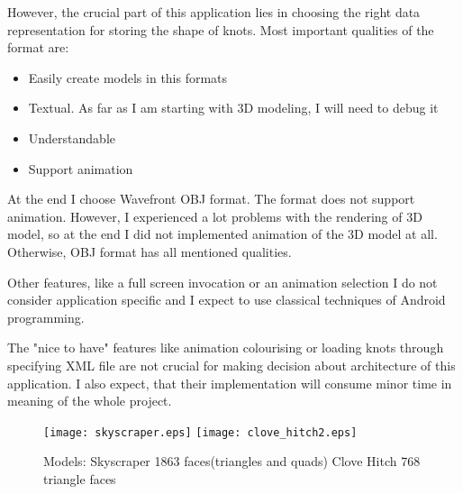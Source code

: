 However, the crucial part of this application lies 
in choosing the right data representation for storing the shape of knots.
Most important qualities of the format are:
\begin{itemize}
    \item Easily create models in this formats
    \item Textual. As far as I am starting with 3D modeling, 
    I will need to debug it
    \item Understandable
    \item Support animation
\end{itemize}

At the end I choose Wavefront OBJ format. The format does not support animation.
However, I experienced a lot problems with the rendering of 3D model,
so at the end I did not implemented animation of the 3D model at all. Otherwise, OBJ format has all mentioned qualities.

Other features, like a full screen invocation or an animation selection
I do not consider application specific and I expect
to use classical techniques of Android programming.

The "nice to have" features like animation colourising 
or loading knots through specifying XML file are not crucial 
for making decision about architecture of this application. 
I also expect, that their implementation will consume minor time
in meaning of the whole project.

\begin{figure}
\texttt{[image: skyscraper.eps]}
\texttt{[image: clove\_hitch2.eps]}
\label{pic:models}
\caption{Models: Skyscraper 1863 faces(triangles and quads) Clove Hitch 768 triangle faces}
\end{figure}

